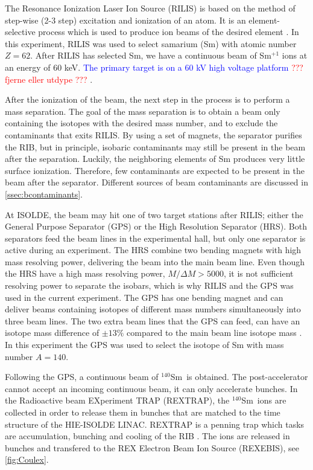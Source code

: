 \documentclass[twoside,english]{uiofysmaster/uiofysmaster}
\newcommand{\Sm}{$^{140}$Sm} %
\let\orgautoref\autoref
\renewcommand{\autoref}
        {%
		 \def\sectionautorefname{Section}%
		 \def\subsectionautorefname{Section}%
		 \def\subsubsectionautorefname{Section}%
		 \def\chapterautorefname{Chapter}%
          \orgautoref}
\begin{document}
The Resonance Ionization Laser Ion Source (RILIS) is based on the method of step-wise (2-3 step) excitation and ionization of an atom. 
It is an element-selective process which is used to produce ion beams of the desired element \cite{RILIS}. 
In this experiment, RILIS was used to select samarium (Sm) with atomic number $Z = 62$. 
After RILIS has selected Sm, we have a continuous beam of Sm$^{+1}$ ions at an energy of 60 keV. 
\textcolor{blue}{The primary target is on a 60 kV high voltage platform} \textcolor{red}{??? fjerne eller utdype ???} \cite{ISOLDE-web, TIF}. 

After the ionization of the beam, the next step in the process is to perform a mass separation.
The goal of the mass separation is to obtain a beam only containing the isotopes with the desired mass number, and to exclude the contaminants that exits RILIS. 
By using a set of magnets, the separator purifies the RIB, but in principle, isobaric contaminants may still be present in the beam after the separation. 
Luckily, the neighboring elements of Sm produces very little surface ionization. 
Therefore, few contaminants are expected to be present in the beam after the separator. 
Different sources of beam contaminants are discussed in \autoref{ssec:bcontaminants}.

At ISOLDE, the beam may hit one of two target stations after RILIS; either the General Purpose Separator (GPS) or the High Resolution Separator (HRS). 
Both separators feed the beam lines in the experimental hall, but only one separator is active during an experiment. 
The HRS combine two bending magnets with high mass resolving power, delivering the beam into the main beam line. 
Even though the HRS have a high mass resolving power, $M/\Delta M > 5000$, it is not sufficient resolving power to separate the isobars, which is why RILIS and the GPS was used in the current experiment.
The GPS has one bending magnet and can deliver beams containing isotopes of different mass numbers simultaneously into three beam lines. 
The two extra beam lines that the GPS can feed, can have an isotope mass difference of $\pm 13 \%$ compared to the main beam line isotope mass \cite{GPS, TIF}.
In this experiment the GPS was used to select the isotope of Sm with mass number $A = 140$. 

Following the GPS, a continuous beam of \Sm\ is obtained. 
The post-accelerator cannot accept an incoming continuous beam, it can only accelerate bunches.
In the Radioactive beam EXperiment TRAP (REXTRAP), the \Sm\ ions are collected in order to release them in bunches that are matched to the time structure of the HIE-ISOLDE LINAC. 
REXTRAP is a penning trap which tasks are accumulation, bunching and cooling of the RIB \cite{HIE-ISOLDE, REXTRAP1, REXTRAP2}. 
The ions are released in bunches and transfered to the REX Electron Beam Ion Source (REXEBIS), see \autoref{fig:Coulex}.
\end{document}
